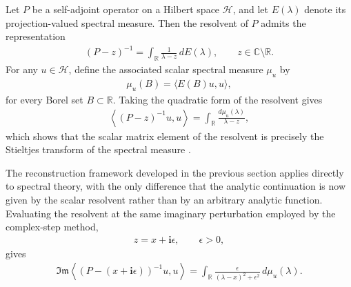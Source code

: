 \documentclass[11pt]{article}
\newcommand{\imag}{\textbf{i}}
\newcommand{\ImagPart}{\mathfrak{Im}}
\begin{document}
    Let \(P\) be a self-adjoint operator on a Hilbert space \(\mathcal{H}\), and let \(E(\lambda)\) denote its projection-valued spectral measure. Then the resolvent of \(P\) admits the representation
    \begin{align}
    	(P-z)^{-1}
    	=
    	\int_{\mathbb{R}}
    	\frac{1}{\lambda-z}\,dE(\lambda),
    	\qquad
    	z\in\mathbb{C}\setminus\mathbb{R}.
    \end{align}
    For any \(u\in\mathcal{H}\), define the associated scalar spectral measure \(\mu_u\) by
    \begin{align*}
    	\mu_u(B)
    	=
    	\langle E(B)u,u\rangle,
    \end{align*}
    for every Borel set \(B\subset\mathbb{R}\). Taking the quadratic form of the resolvent gives
    \begin{align}
    	\left\langle (P-z)^{-1}u,u\right\rangle
    	=
    	\int_{\mathbb{R}}
    	\frac{d\mu_u(\lambda)}{\lambda-z},
    	\label{eq.quadratic_resolvent}
    \end{align}
    which shows that the scalar matrix element of the resolvent is precisely the Stieltjes transform of the spectral measure \citep[e.g.][]{demuth2005determining,akhiezer2020classical,teschl2014mathematical}. 
    
    The reconstruction framework developed in the previous section applies directly to spectral theory, with the only difference that the analytic continuation is now given by the scalar resolvent rather than by an arbitrary analytic function. Evaluating the resolvent at the same imaginary perturbation employed by the complex-step method,
    \begin{align*}
    	z=x+\imag\epsilon,
    	\qquad
    	\epsilon>0,
    \end{align*}
    gives
    \begin{align}
    	\ImagPart
    	\left\langle
    	\left(P-(x+\imag\epsilon)\right)^{-1}u,u
    	\right\rangle
    	=
    	\int_{\mathbb{R}}
    	\frac{\epsilon}
    	{(\lambda-x)^2+\epsilon^2}
    	\,d\mu_u(\lambda).
    \end{align}
    
\end{document}
